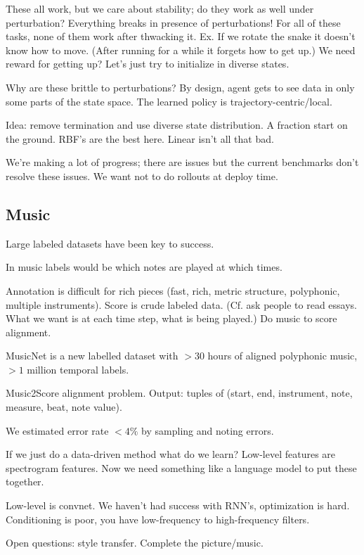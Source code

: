 These all work, but we care about stability; do they work as well under perturbation? Everything breaks in presence of perturbations! For all of these tasks, none of them work after thwacking it.
Ex.  If we rotate the snake it doesn't know how to move. 
%
(After running for a while it forgets how to get up.)
We need reward for getting up?
Let's just try to initialize in diverse states.

Why are these brittle to perturbations? By design, agent gets to see data in only some parts of the state space. The learned policy is trajectory-centric/local.

Idea: remove termination and use diverse state distribution. A fraction start on the ground. RBF's are the best here. Linear isn't all that bad. 

We're making a lot of progress; there are issues but the current benchmarks don't resolve these issues.
We want not to do rollouts at deploy time.


\subsection{Music}

Large labeled datasets have been key to success. 

In music labels would be which notes are played at which times.

Annotation is difficult for rich pieces (fast, rich, metric structure, polyphonic, multiple instruments).
Score is crude labeled data. (Cf. ask people to read essays. What we want is at each time step, what is being played.)
Do music to score alignment.

MusicNet is a new labelled dataset with $>30$ hours of aligned polyphonic music, $>1$ million temporal labels.

Music2Score alignment problem. Output: tuples of (start, end, instrument, note, measure, beat, note value). 


We estimated error rate $<4\%$ by sampling and noting errors.

If we just do a data-driven method what do we learn? Low-level features are spectrogram features. Now we need something like a language model  to put these together.

Low-level is convnet. We haven't had success with RNN's, optimization is hard. Conditioning is poor, you have low-frequency to high-frequency filters.

Open questions: style transfer. Complete the picture/music.




